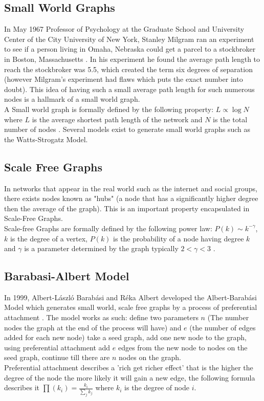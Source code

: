 \documentclass{article}
\begin{document}
        \subsection{Small World Graphs}
        In May 1967 Professor of Psychology at the Graduate School and University Center of the City University of New York, Stanley Milgram ran an experiment to see if a person living
        in Omaha, Nebraska could get a parcel to a stockbroker in Boston, Massachusetts \parencite{milgram1967small}. In his experiment he found the average path length to reach the stockbroker was 5.5, which created the term
        six degrees of separation (however Milgram's experiment had flaws which puts the exact number into doubt). This idea of having such a small average path length for such numerous nodes is a hallmark of a small world graph.\\
        A Small world graph is formally defined by the following property: $L\propto\log{N}$ where $L$ is the average shortest path length of the network and $N$ is the total number of nodes \parencite{Watts1998}. Several models exist to generate small world graphs such as the Watts-Strogatz Model.

        \subsection{Scale Free Graphs}
        In networks that appear in the real world such as the internet and social groups, there exists nodes known as "hubs" (a node that has a  significantly higher degree then the average of the graph). This is an important property encapsulated in Scale-Free Graphs.\\ 
        Scale-free Graphs are formally defined by the following power law: $P(k) \sim  k^{-\gamma }$, $k$ is the degree of a vertex, $P(k)$ is the probability of a node having degree $k$ and $\gamma$ is a parameter determined by the graph typically $2<\gamma<3$ \parencite{onnela2007structure}.

        \subsection{Barabasi-Albert Model}
        In 1999, Albert-László Barabási and Réka Albert developed the Albert-Barabási Model which generates small world, scale free graphs by a process of preferential attachment \parencite{barabasi1999emergence}. The model works as such: define two parameters $n$ (The number nodes the graph at the end of the process will have) and $e$ (the number of edges added for each new node) take a seed graph, add one new node to the graph, using preferential attachment add $e$ edges from the new node to nodes on the seed graph, continue till there are $n$ nodes on the graph.\\
        Preferential attachment describes a 'rich get richer effect' that is the higher the degree of the node the more likely it will gain a new edge, the following formula describes it $\prod (k_{i}) = \frac{k_{i}}{\sum_{j} {k_{j}}}$ where $k_{i}$ is the degree of node $i$. 
\end{document}
